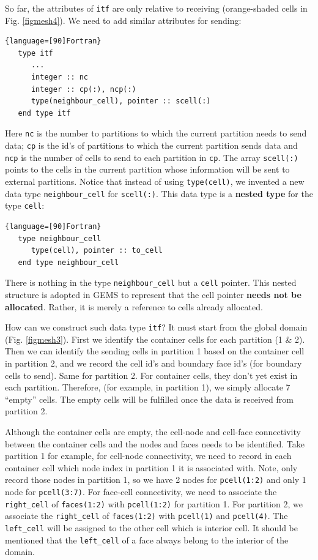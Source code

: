 \documentclass[12pt, letterpaper]{report}
\begin{document}
So far, the attributes of \verb+itf+ are only relative to receiving (orange-shaded cells in Fig. \ref{figmesh4}). We need to add similar attributes for sending:

\begin{lstlisting}{language=[90]Fortran}
   type itf
      ...
      integer :: nc
      integer :: cp(:), ncp(:)
      type(neighbour_cell), pointer :: scell(:)
   end type itf
\end{lstlisting}

Here \verb+nc+ is the number to partitions to which the current partition needs to send data;
\verb+cp+ is the id's of partitions to which the current partition sends data and \verb+ncp+ is the
number of cells to send to each partition in \verb+cp+. The array \verb+scell(:)+ points to the
cells in the current partition whose information will be sent to external partitions. Notice that
instead of using \verb+type(cell)+, we invented a new data type \verb+neighbour_cell+ for
\verb+scell(:)+. This data type is a {\bf nested type} for the type \verb+cell+:

\begin{lstlisting}{language=[90]Fortran}
   type neighbour_cell
      type(cell), pointer :: to_cell
   end type neighbour_cell
\end{lstlisting}

There is nothing in the type \verb+neighbour_cell+ but a \verb+cell+ pointer. This nested structure
is adopted in GEMS to represent that the cell pointer {\bf needs not be allocated}. Rather, it is
merely a reference to cells already allocated.
\paraspace

How can we construct such data type \verb+itf+? It must start from the global domain (Fig.
\ref{figmesh3}). First we identify the container cells for each partition (1 \& 2). Then we can
identify the sending cells in partition 1 based on the container cell in partition 2, and we record
the cell id's and boundary face id's (for boundary cells to send). Same for partition 2. For
container cells, they don't yet exist in each partition. Therefore, (for example, in partition 1), we simply
allocate 7 ``empty'' cells. The empty cells will be fulfilled once the data is received from
partition 2.
\paraspace

Although the container cells are empty, the cell-node and cell-face connectivity between the
container cells and the nodes and faces needs to be identified. Take partition 1 for example, for
cell-node connectivity, we need to record in each container cell which node index in partition 1 it
is associated with. Note, only record those nodes in partition 1, so we have 2 nodes for
\verb+pcell(1:2)+ and only 1 node for \verb+pcell(3:7)+. For face-cell connectivity, we need to
associate the \verb+right_cell+ of \verb+faces(1:2)+ with \verb+pcell(1:2)+ for partition 1. For
partition 2, we associate the \verb+right_cell+ of \verb+faces(1:2)+ with \verb+pcell(1)+ and
\verb+pcell(4)+. The \verb+left_cell+ will be assigned to the other cell which is interior cell. It
should be mentioned that the \verb+left_cell+ of a face always belong to the interior of the domain.
\paraspace
\end{document}
